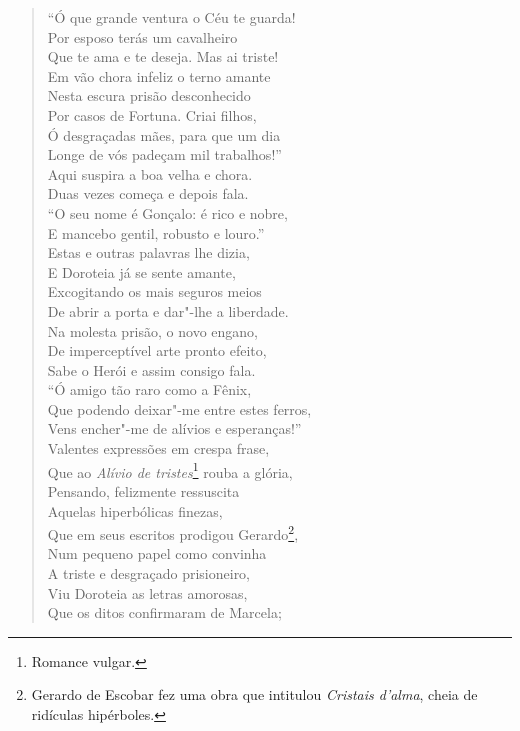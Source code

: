 \begin{verse}
``Ó que grande ventura o Céu te guarda!\\
Por esposo terás um cavalheiro\\
Que te ama e te deseja. Mas ai triste!\\
Em vão chora infeliz o terno amante\\
Nesta escura prisão desconhecido\\
Por casos de Fortuna. Criai filhos,\\			\index{\Fortu}
Ó desgraçadas mães, para que um dia\\
Longe de vós padeçam mil trabalhos!''\\
Aqui suspira a boa velha e chora.\\
Duas vezes começa e depois fala.\\
``O seu nome é Gonçalo: é rico e nobre,\\
E mancebo gentil, robusto e louro.''\\
Estas e outras palavras lhe dizia,\\
E Doroteia já se sente amante,\\
Excogitando os mais seguros meios\\
De abrir a porta e dar"-lhe a liberdade.\\
Na molesta prisão, o novo engano,\\
De imperceptível arte pronto efeito,\\
Sabe o Herói e assim consigo fala.\\
``Ó amigo tão raro como a Fênix,\\
Que podendo deixar"-me entre estes ferros,\\
Vens encher"-me de alívios e esperanças!''\\
Valentes expressões em crespa frase,\\
Que ao \textit{Alívio de tristes}\footnote{ Romance vulgar.} rouba a glória,\\		\index{\Romvulg}
Pensando, felizmente ressuscita\\
Aquelas hiperbólicas finezas,\\
Que em seus escritos prodigou Gerardo\footnote{ Gerardo de Escobar fez
uma obra que intitulou \textit{Cristais d'alma}, cheia de ridículas
hipérboles.},\\ %
Num pequeno papel como convinha\\
A triste e desgraçado prisioneiro,\\
Viu Doroteia as letras amorosas,\\
Que os ditos confirmaram de Marcela;\\

\end{verse}
